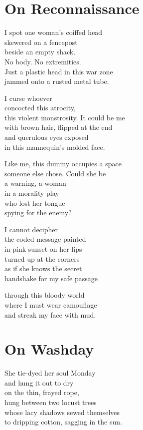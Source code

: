 \documentclass[twoside,10pt]{book}
\begin{document}
\clearpage
\section{On Reconnaissance}

I spot one woman's coiffed head\\
skewered on a fencepost\\
beside an empty shack.\\
No body. No extremities.\\
Just a plastic head in this war zone\\
jammed onto a rusted metal tube.

I curse whoever\\
concocted this atrocity,\\
this violent monstrosity. It could be me\\
with brown hair, flipped at the end\\
and querulous eyes exposed\\
in this mannequin's molded face.

Like me, this dummy occupies a space\\
someone else chose. Could she be\\
a warning, a woman\\
in a morality play\\
who lost her tongue\\
spying for the enemy?

I cannot decipher\\
the coded message painted\\
in pink sunset on her lips\\
turned up at the corners\\
as if she knows the secret\\
handshake for my safe passage

through this bloody world\\
where I must wear camouflage\\
and streak my face with mud.


\clearpage
\section{On Washday}

She tie-dyed her soul Monday\\
and hung it out to dry\\
on the thin, frayed rope,\\
hung between two locust trees\\
whose lacy shadows sewed themselves\\
to dripping cotton, sagging in the sun.
\end{document}
